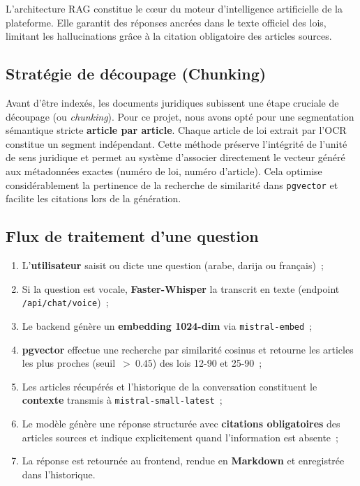 \documentclass[12pt,a4paper]{report}
\begin{document}
L'architecture RAG constitue le cœur du moteur d'intelligence artificielle de la plateforme. Elle garantit des réponses ancrées dans le texte officiel des lois, limitant les hallucinations grâce à la citation obligatoire des articles sources.

\subsection{Stratégie de découpage (Chunking)}

Avant d'être indexés, les documents juridiques subissent une étape cruciale de découpage (ou \textit{chunking}). Pour ce projet, nous avons opté pour une segmentation sémantique stricte \textbf{article par article}. Chaque article de loi extrait par l'OCR constitue un segment indépendant. Cette méthode préserve l'intégrité de l'unité de sens juridique et permet au système d'associer directement le vecteur généré aux métadonnées exactes (numéro de loi, numéro d'article). Cela optimise considérablement la pertinence de la recherche de similarité dans \texttt{pgvector} et facilite les citations lors de la génération.

\subsection{Flux de traitement d'une question}

\begin{enumerate}[label=\arabic*.]
    \item L'\textbf{utilisateur} saisit ou dicte une question (arabe, darija ou français)~;
    \item Si la question est vocale, \textbf{Faster-Whisper} la transcrit en texte (endpoint \texttt{/api/chat/voice})~;
    \item Le backend génère un \textbf{embedding 1024-dim} via \texttt{mistral-embed}~;
    \item \textbf{pgvector} effectue une recherche par similarité cosinus et retourne les articles les plus proches (seuil~$>~0.45$) des lois 12-90 et 25-90~;
    \item Les articles récupérés et l'historique de la conversation constituent le \textbf{contexte} transmis à \texttt{mistral-small-latest}~;
    \item Le modèle génère une réponse structurée avec \textbf{citations obligatoires} des articles sources et indique explicitement quand l'information est absente~;
    \item La réponse est retournée au frontend, rendue en \textbf{Markdown} et enregistrée dans l'historique.
\end{enumerate}
\end{document}

